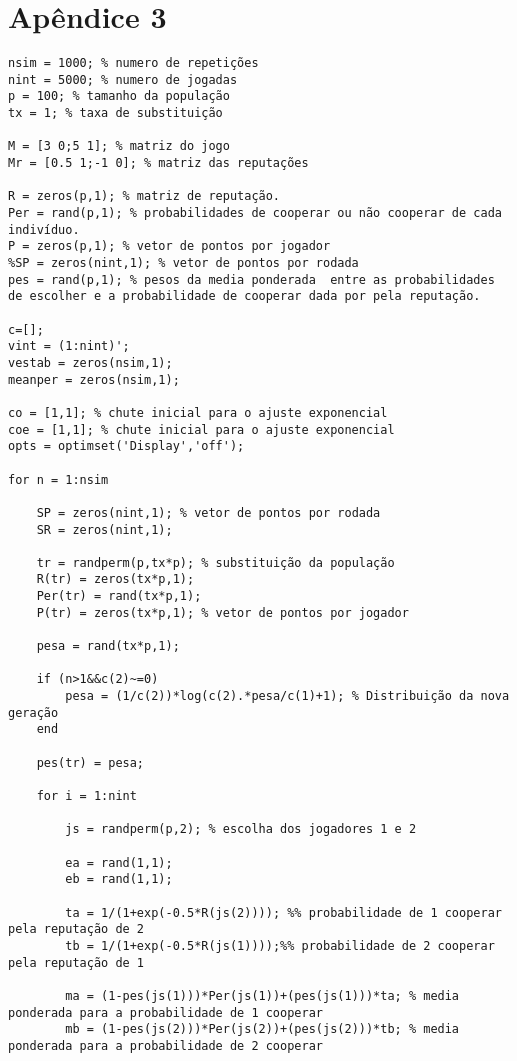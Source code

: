 %

\section*{Apêndice 3}

{\scriptsize
\begin{verbatim}
nsim = 1000; % numero de repetições
nint = 5000; % numero de jogadas
p = 100; % tamanho da população
tx = 1; % taxa de substituição

M = [3 0;5 1]; % matriz do jogo
Mr = [0.5 1;-1 0]; % matriz das reputações

R = zeros(p,1); % matriz de reputação.
Per = rand(p,1); % probabilidades de cooperar ou não cooperar de cada indivíduo.
P = zeros(p,1); % vetor de pontos por jogador
%SP = zeros(nint,1); % vetor de pontos por rodada
pes = rand(p,1); % pesos da media ponderada  entre as probabilidades de escolher e a probabilidade de cooperar dada por pela reputação.

c=[];
vint = (1:nint)';
vestab = zeros(nsim,1);
meanper = zeros(nsim,1);

co = [1,1]; % chute inicial para o ajuste exponencial
coe = [1,1]; % chute inicial para o ajuste exponencial
opts = optimset('Display','off');

for n = 1:nsim
    
    SP = zeros(nint,1); % vetor de pontos por rodada
    SR = zeros(nint,1);
    
    tr = randperm(p,tx*p); % substituição da população
    R(tr) = zeros(tx*p,1);
    Per(tr) = rand(tx*p,1);
    P(tr) = zeros(tx*p,1); % vetor de pontos por jogador
    
    pesa = rand(tx*p,1);
    
    if (n>1&&c(2)~=0)
        pesa = (1/c(2))*log(c(2).*pesa/c(1)+1); % Distribuição da nova geração
    end
    
    pes(tr) = pesa;
    
    for i = 1:nint
        
        js = randperm(p,2); % escolha dos jogadores 1 e 2
        
        ea = rand(1,1);
        eb = rand(1,1);
        
        ta = 1/(1+exp(-0.5*R(js(2)))); %% probabilidade de 1 cooperar pela reputação de 2
        tb = 1/(1+exp(-0.5*R(js(1))));%% probabilidade de 2 cooperar pela reputação de 1
        
        ma = (1-pes(js(1)))*Per(js(1))+(pes(js(1)))*ta; % media ponderada para a probabilidade de 1 cooperar
        mb = (1-pes(js(2)))*Per(js(2))+(pes(js(2)))*tb; % media ponderada para a probabilidade de 2 cooperar
        

\end{verbatim}}

